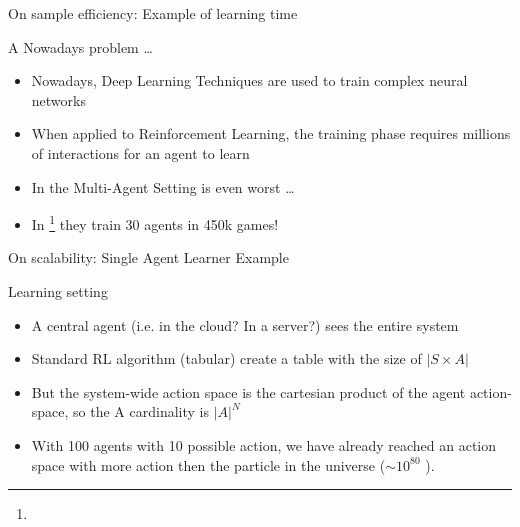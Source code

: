 \documentclass[presentation]{beamer}\mode<presentation>{\usetheme{AMSBolognaFC}}
\begin{document}
\begin{frame}{On sample efficiency: Example of learning time }
	\begin{exampleblock}{A Nowadays problem \dots}
		\begin{itemize}
			\item Nowadays, Deep Learning Techniques are used to train complex neural networks
			\item When applied to Reinforcement Learning, the training phase requires millions of interactions for an agent to learn
			\item In the Multi-Agent Setting is even worst \dots
			\item In \footnote[frame]{} they train 30 agents in 450k games!
		\end{itemize}
	\end{exampleblock}
\end{frame}
\begin{frame}{On scalability: Single Agent Learner Example}
	\begin{exampleblock}{Learning setting}
		\begin{itemize}
			\item A central agent (i.e. in the cloud? In a server?) sees the entire system
			\item Standard RL algorithm (tabular) create a table with the size of $|S \times A|$
			\item But the system-wide action space is the cartesian product of the agent action-space, so the A cardinality is $|A|^N$
			\item With 100 agents with 10 possible action, we have already reached an action space with more action then the particle in the universe ($\sim 10^{80}$ \href{https://en.wikipedia.org/wiki/Eddington_number}{\faLink}).
		\end{itemize}
	\end{exampleblock}
\end{frame}
\end{document}
